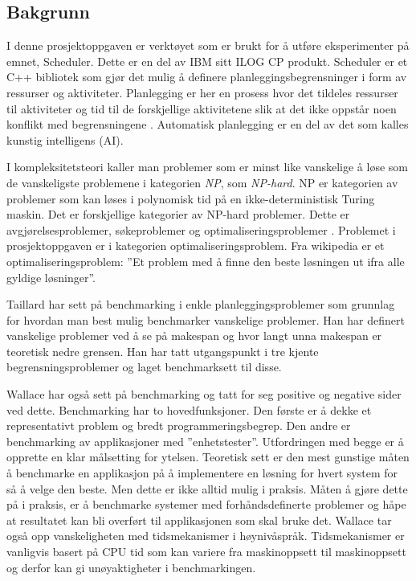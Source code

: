 \subsection{Bakgrunn}
I denne prosjektoppgaven er verktøyet som er brukt for å utføre eksperimenter på emnet, Scheduler. Dette er en del av IBM sitt ILOG CP produkt. Scheduler er et C++ bibliotek som gjør det mulig å definere planleggingsbegrensninger i form av ressurser og aktiviteter. Planlegging er her en prosess hvor det tildeles ressurser til aktiviteter og tid til de forskjellige aktivitetene slik at det ikke oppstår noen konflikt med begrensningene \cite{Pape94implementationof}. Automatisk planlegging er en del av det som kalles kunstig intelligens (AI).

I kompleksitetsteori \cite{compcomplextheory} kaller man problemer som er minst like vanskelige å løse som de vanskeligste problemene i kategorien \textit{NP}, som \textit{NP-hard}. NP er kategorien av problemer som kan løses i polynomisk tid på en ikke-deterministisk Turing maskin. Det er forskjellige kategorier av NP-hard problemer. Dette er avgjørelsesproblemer, søkeproblemer og optimaliseringsproblemer \cite{nphardwikipedia}. Problemet i prosjektoppgaven er i kategorien optimaliseringsproblem. Fra wikipedia \cite{optimizationproblemwiki} er et optimaliseringsproblem: ''Et problem med å finne den beste løsningen ut ifra alle gyldige løsninger''.

Taillard \cite{Taillard1993278} har sett på benchmarking i enkle planleggingsproblemer som grunnlag for hvordan man best mulig benchmarker vanskelige problemer. Han har definert vanskelige problemer ved å se på makespan og hvor langt unna makespan er teoretisk nedre grensen. Han har tatt utgangspunkt i tre kjente begrensningsproblemer og laget benchmarksett til disse.

Wallace \cite{Wallace:2004:BCL:956860.956861} har også sett på benchmarking og tatt for seg positive og negative sider ved dette. Benchmarking har to hovedfunksjoner. Den første er å dekke et representativt problem og bredt programmeringsbegrep. Den andre er benchmarking av applikasjoner med ''enhetstester''. Utfordringen med begge er å opprette en klar målsetting for ytelsen. Teoretisk sett er den mest gunstige måten å benchmarke en applikasjon på å implementere en løsning for hvert system for så å velge den beste. Men dette er ikke alltid mulig i praksis. Måten å gjøre dette på i praksis, er å benchmarke systemer med forhåndsdefinerte problemer og håpe at resultatet kan bli overført til applikasjonen som skal bruke det. Wallace tar også opp vanskeligheten med tidsmekanismer i høynivåspråk. Tidsmekanismer er vanligvis basert på CPU tid som kan variere fra maskinoppsett til maskinoppsett og derfor kan gi unøyaktigheter i benchmarkingen.